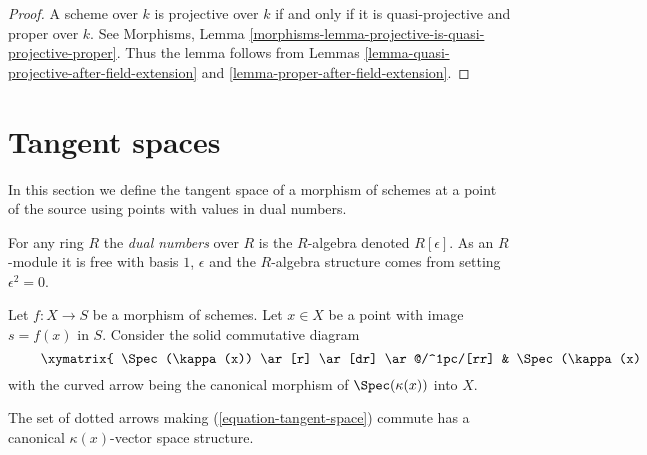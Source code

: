 \begin{proof}
A scheme over $k$ is projective over $k$ if and only if it is
quasi-projective and proper over $k$. See
Morphisms, Lemma \ref{morphisms-lemma-projective-is-quasi-projective-proper}.
Thus the lemma follows from
Lemmas \ref{lemma-quasi-projective-after-field-extension} and
\ref{lemma-proper-after-field-extension}.
\end{proof}




\section{Tangent spaces}
\label{section-tangent-spaces}

\noindent
In this section we define the tangent space of a morphism of schemes
at a point of the source using points with values in dual numbers.

\begin{definition}
\label{definition-dual-numbers}
For any ring $R$ the {\it dual numbers} over $R$ is the
$R$-algebra denoted $R[\epsilon]$. As an $R$-module it is free with
basis $1$, $\epsilon$ and the $R$-algebra structure comes from setting
$\epsilon^2 = 0$.
\end{definition}

\noindent
Let $f : X \to S$ be a morphism of schemes.
Let $x \in X$ be a point with image $s = f(x)$ in $S$.
Consider the solid commutative diagram
\begin{equation}
\label{equation-tangent-space}
\vcenter{
\xymatrix{
\Spec(\kappa(x)) \ar[r] \ar[dr] \ar@/^1pc/[rr] &
\Spec(\kappa(x)[\epsilon]) \ar@{.>}[r] \ar[d]&
X \ar[d] \\
&
\Spec(\kappa(s)) \ar[r] &
S
}
}
\end{equation}
with the curved arrow being the canonical morphism of
$\Spec(\kappa(x))$ into $X$.

\begin{lemma}
\label{lemma-tangent-space}
The set of dotted arrows making (\ref{equation-tangent-space}) commute
has a canonical $\kappa(x)$-vector space structure.
\end{lemma}

